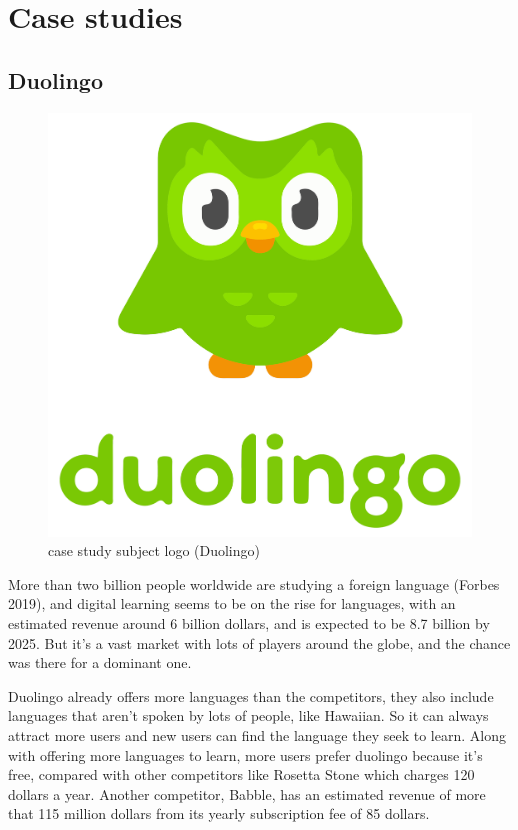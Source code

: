\documentclass[../main.tex]{subfiles}
\begin{document}
\section{Case studies}
\subsection{Duolingo}

\begin{figure}[!ht]
\centering
\includegraphics[scale=0.05]{images/chapter2/image8.png}
\caption{case study subject logo (Duolingo)}
\label{case study subject logo (Duolingo)}
\end{figure}

More than two billion people worldwide are studying a foreign language (Forbes 2019), and digital learning seems to be on the rise for languages, with an estimated revenue around 6 billion dollars, and is expected to be 8.7 billion by 2025. But it's a vast market with lots of players around the globe, and the chance was there for a dominant one.

Duolingo already offers more languages than the competitors, they also include languages that aren’t spoken by lots of people, like Hawaiian. So it can always attract more users and new users can find the language they seek to learn. Along with offering more languages to learn, more users prefer duolingo because it’s free, compared with other competitors like Rosetta Stone which charges 120 dollars a year. Another competitor, Babble, has an estimated revenue of more that 115 million dollars from its yearly subscription fee of 85 dollars. 
\end{document}
